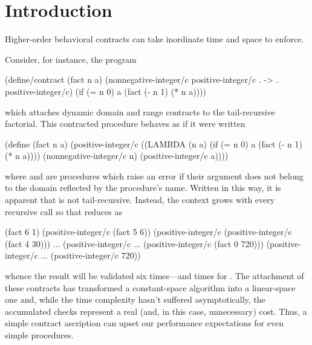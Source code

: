 \documentclass{sigplanconf}
\begin{document}

\section{Introduction}

Higher-order behavioral contracts can take inordinate time and space to enforce.



Consider, for instance, the program
\begin{schemedisplay}
(define/contract (fact n a)
  (nonnegative-integer/c positive-integer/c . -> . positive-integer/c)
  (if (= n 0)
      a
      (fact (- n 1) (* n a))))
\end{schemedisplay}
which attaches dynamic domain and range contracts to the tail-recursive factorial.
This contracted procedure behaves as if it were written
\begin{schemedisplay}
(define (fact n a)
  (positive-integer/c
   ((LAMBDA (n a)
      (if (= n 0)
          a
          (fact (- n 1) (* n a))))
    (nonnegative-integer/c n)
    (positive-integer/c a))))
\end{schemedisplay}
where  and  are procedures which raise an error if their argument does not belong to the domain reflected by the procedure's name.
Written in this way, it is apparent that  is not tail-recursive.
Instead, the context grows with every recursive call so that  reduces as
\begin{schemedisplay}
(fact 6 1)
(positive-integer/c (fact 5 6))
(positive-integer/c (positive-integer/c (fact 4 30)))
...
(positive-integer/c ... (positive-integer/c (fact 0 720)))
(positive-integer/c ... (positive-integer/c 720))
\end{schemedisplay}
whence the result will be validated six times---and  times for .
The attachment of these contracts has transformed a constant-space algorithm into a linear-space one and, while the time complexity hasn't suffered asymptotically, the accumulated checks represent a real (and, in this case, unnecessary) cost.
Thus, a simple contract ascription can upset our performance expectations for even simple procedures.
\end{document}
